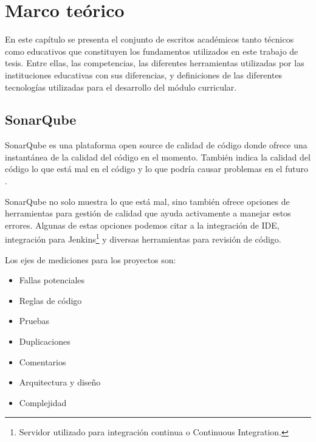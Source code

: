 \chapter{Marco teórico} %
En este capítulo se presenta el conjunto de escritos académicos tanto técnicos como educativos que constituyen los fundamentos utilizados en este trabajo de tesis. Entre ellas, las competencias, las diferentes herramientas utilizadas por las instituciones educativas con sus diferencias, y definiciones de las diferentes tecnologías utilizadas para el desarrollo del módulo curricular.

\label{capitulo2} %












\section{SonarQube}
SonarQube es una plataforma open source de calidad de código donde ofrece una instantánea de la calidad del código en el momento. También indica la calidad del código lo que está mal en el código y lo que podría causar problemas en el futuro \citep{campbell2013sonarqube}.

SonarQube no solo muestra lo que está mal, sino también ofrece opciones de herramientas para gestión de calidad que ayuda activamente a manejar estos errores. Algunas de estas opciones podemos citar a la integración de IDE, integración para Jenkins\footnote{Servidor utilizado para integración continua o Continuous Integration.} y diversas herramientas para revisión de código.

Los ejes de mediciones para los proyectos son:
\begin{itemize}
	\item Fallas potenciales
	\item Reglas de código
	\item Pruebas
	\item Duplicaciones
	\item Comentarios
	\item Arquitectura y diseño
	\item Complejidad
\end{itemize}

